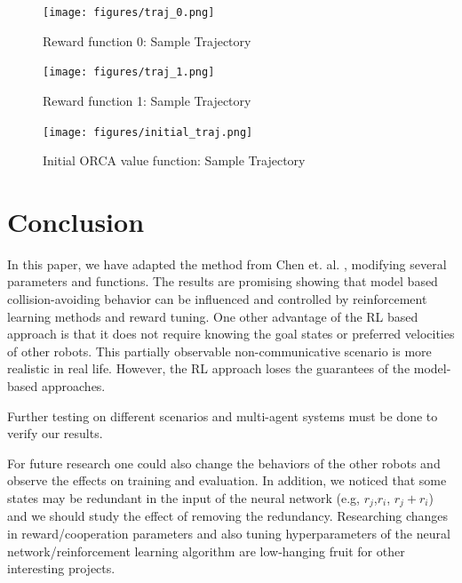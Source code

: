 \documentclass[conference]{IEEEtran}
\begin{document}
\begin{figure}
    \centering
    \texttt{[image: figures/traj\_0.png]}
    \caption{Reward function 0: Sample Trajectory}
    \label{fig:rew_0_traj}
\end{figure}
\begin{figure}
    \centering
    \texttt{[image: figures/traj\_1.png]}
    \caption{Reward function 1: Sample Trajectory}
    \label{fig:rew_1_traj}
\end{figure}
\begin{figure}
    \centering
    \texttt{[image: figures/initial\_traj.png]}
    \caption{Initial ORCA value function: Sample Trajectory}
    \label{fig:initial_traj}
\end{figure}
\section{Conclusion}
In this paper, we have adapted the method from Chen et. al. \cite{chen2017cadrl}, modifying several parameters and functions. The results are promising showing that model based collision-avoiding behavior can be influenced and controlled by reinforcement learning methods and reward tuning. One other advantage of the RL based approach is that it does not require knowing the goal states or preferred velocities of other robots. This partially observable non-communicative scenario is more realistic in real life. However, the RL approach loses the guarantees of the model-based approaches.  

Further testing on different scenarios and multi-agent systems must be done to verify our results. 

For future research one could also change the behaviors of the other robots and observe the effects on training and evaluation. In addition, we noticed that some states may be redundant in the input of the neural network (e.g, $ r_j $,$ r_i $, $r_j+r_i$) and we should study the effect of removing the redundancy. Researching changes in reward/cooperation parameters and also tuning hyperparameters of the neural network/reinforcement learning algorithm are low-hanging fruit for other interesting projects. 



\end{document}
